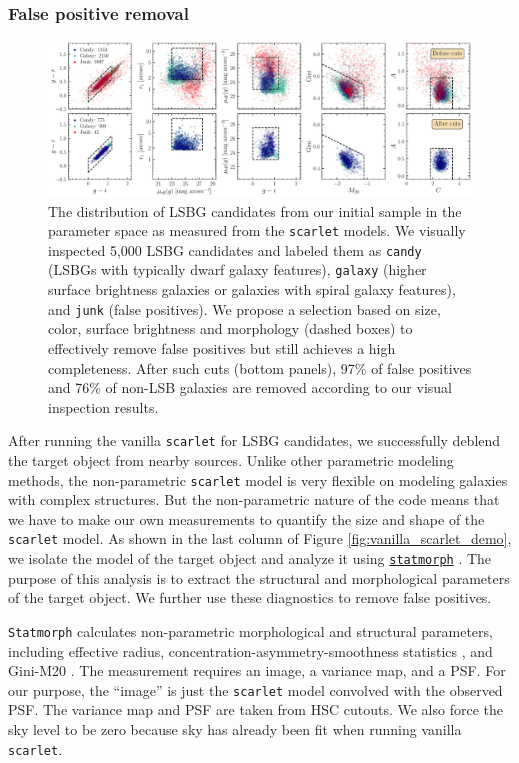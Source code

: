 \documentclass[twocolumn,astrosymb,twocolappendix]{aastex631}
\newcommand{\code}[1]{\texttt{#1}}
\begin{document}
\begin{CJK*}{UTF8}{gbsn}
\subsubsection{False positive removal}\label{sec:non-par-measurement}

\begin{figure}
	\vbox{
		\centering
		\includegraphics[width=1.0\linewidth]{deblending_cuts.pdf}
	}
	\caption{The distribution of LSBG candidates from our initial sample in the parameter space as measured from the \code{scarlet} models. We visually inspected 5,000 LSBG candidates and labeled them as \code{candy} (LSBGs with typically dwarf galaxy features), \code{galaxy} (higher surface brightness galaxies or galaxies with spiral galaxy features), and \code{junk} (false positives). We propose a selection based on size, color, surface brightness and morphology (dashed boxes) to effectively remove false positives but still achieves a high completeness. After such cuts (bottom panels), 97\% of false positives and 76\% of non-LSB galaxies are removed according to our visual inspection results. 
	}
	\label{fig:deblending_cuts}
\end{figure}

After running the vanilla \code{scarlet} for LSBG candidates, we successfully deblend the target object from nearby sources. Unlike other parametric modeling methods, the non-parametric \code{scarlet} model is very flexible on modeling galaxies with complex structures. But the non-parametric nature of the code means that we have to make our own measurements to quantify the size and shape of the \code{scarlet} model. As shown in the last column of Figure \ref{fig:vanilla_scarlet_demo}, we isolate the model of the target object and analyze it using \href{https://statmorph.readthedocs.io/en/latest/}{\code{statmorph}} \citep{statmorph}. The purpose of this analysis is to extract the structural and morphological parameters of the target object. We further use these diagnostics to remove false positives. 

\code{Statmorph} calculates non-parametric morphological and structural parameters, including effective radius, concentration-asymmetry-smoothness statistics \citep[CAS,][]{Conselice2003}, and Gini-M20 \citep{Abraham2003,Lotz2004}. The measurement requires an image, a variance map, and a PSF. For our purpose, the ``image'' is just the \code{scarlet} model convolved with the observed PSF. The variance map and PSF are taken from HSC cutouts. We also force the sky level to be zero because sky has already been fit when running vanilla \code{scarlet}. 


\end{CJK*}
\end{document}
